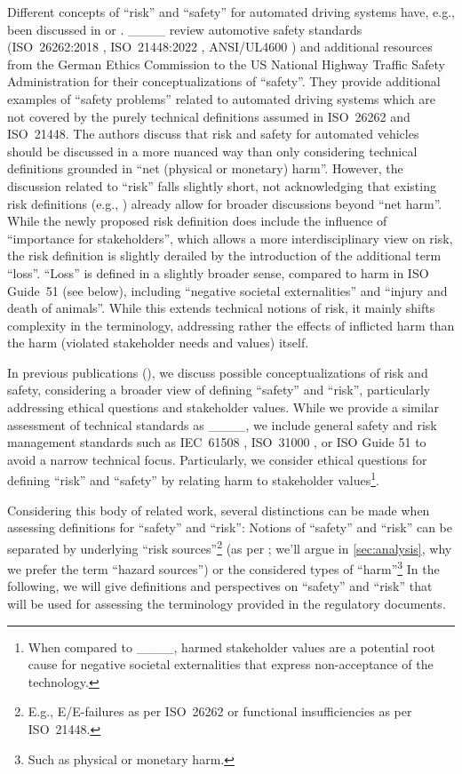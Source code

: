 Different concepts of ``risk'' and ``safety'' for automated driving systems have, e.g., been discussed in \parencite{koopman2024} or \parencite{salem2024}.
____ \parencite{koopman2024} review automotive safety standards (ISO~26262:2018 \parencite{iso2018}, ISO~21448:2022 \parencite{iso21448}, ANSI/UL4600 \parencite{ul4600}) and additional resources from the German Ethics Commission \parencite{difabio2017} to the US National Highway Traffic Safety Administration for their conceptualizations of ``safety''.
They provide additional examples of ``safety problems'' related to automated driving systems which are not covered by the purely technical definitions assumed in ISO~26262 and ISO~21448.
The authors discuss that risk and safety for automated vehicles should be discussed in a more nuanced way than only considering technical definitions grounded in ``net (physical or monetary) harm''.
However, the discussion related to ``risk'' falls slightly short, not acknowledging that existing risk definitions (e.g., \parencite{fischhoff1984,renn1998}) already allow for broader discussions beyond ``net harm''.
While the newly proposed risk definition does include the influence of ``importance for stakeholders'', which allows a more interdisciplinary view on risk, the risk definition is slightly derailed by the introduction of the additional term ``loss''.
``Loss'' is defined in a slightly broader sense, compared to harm in ISO Guide~51 (see below), including ``negative societal externalities'' and ``injury and death of animals''.
While this extends technical notions of risk, it mainly shifts complexity in the terminology, addressing rather the effects of inflicted harm than the harm (violated stakeholder needs and values) itself.

In previous publications (\parencite{salem2024, nolte2024}), we discuss possible conceptualizations of risk and safety, considering a broader view of defining ``safety'' and ``risk'', particularly addressing ethical questions and stakeholder values.
While we provide a similar assessment of technical standards as ____, we include general safety and risk management standards such as IEC~61508 \parencite{iec61508}, ISO~31000 \parencite{iso31000}, or ISO Guide 51 \parencite{iso51} to avoid a narrow technical focus.
Particularly, we consider ethical questions for defining ``risk'' and ``safety'' by relating harm to stakeholder values\footnote{When compared to ____, harmed stakeholder values are a potential root cause for negative societal externalities that express non-acceptance of the technology.}.

Considering this body of related work, several distinctions can be made when assessing definitions for ``safety'' and ``risk'':
Notions of ``safety'' and ``risk'' can be separated by underlying ``risk sources''\footnote{E.g., E/E-failures as per ISO~26262 or functional insufficiencies as per ISO~21448.} (as per \parencite{christensen2003}; we'll argue in \cref{sec:analysis}, why we prefer the term ``hazard sources'') or the considered types of ``harm''\footnote{Such as physical or monetary harm.}
In the following, we will give definitions and perspectives on ``safety'' and ``risk'' that will be used for assessing the terminology provided in the regulatory documents.